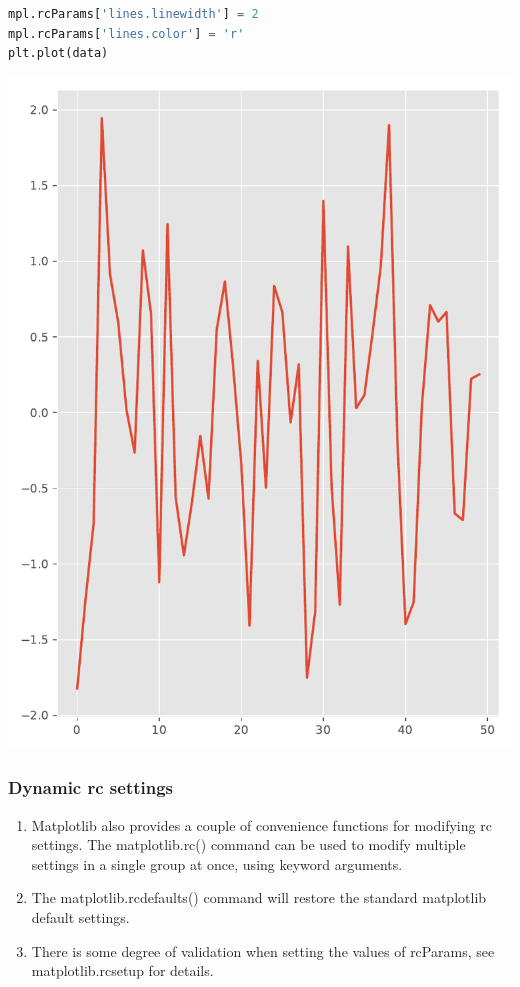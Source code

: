 \documentclass[UTF8,a4paper,12pt]{ctexart}  %
\providecommand{\tightlist}{\setlength{\itemsep}{0pt}\setlength{\parskip}{0pt}}
\begin{document}
\begin{lstlisting}[language=Python]
mpl.rcParams['lines.linewidth'] = 2
mpl.rcParams['lines.color'] = 'r'
plt.plot(data)
\end{lstlisting}

\begin{center}\includegraphics[width=0.9\linewidth]{python-visualization_files/figure-latex/unnamed-chunk-35-1} \end{center}

\hypertarget{dynamic-rc-settings-1}{%
\subsubsection{Dynamic rc settings}\label{dynamic-rc-settings-1}}

\begin{enumerate}
\def\labelenumi{\arabic{enumi}.}
\tightlist
\item
  Matplotlib also provides a couple of convenience functions for
  modifying rc settings. The matplotlib.rc() command can be used to
  modify multiple settings in a single group at once, using keyword
  arguments.
\item
  The matplotlib.rcdefaults() command will restore the standard
  matplotlib default settings.
\item
  There is some degree of validation when setting the values of
  rcParams, see matplotlib.rcsetup for details.
\end{enumerate}
\end{document}
